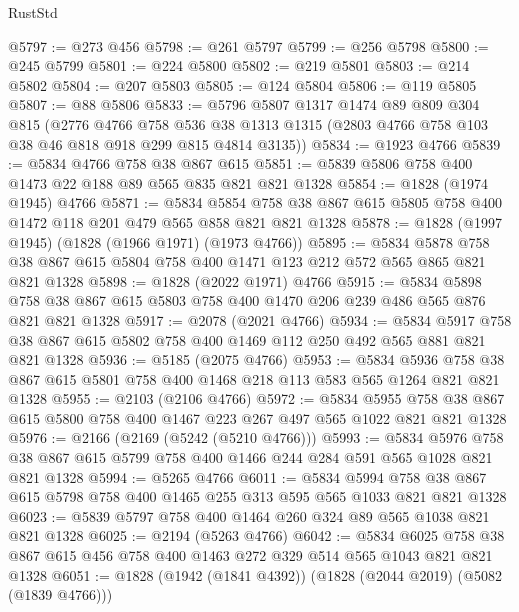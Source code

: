 \begin{lexlean}{RustStd}
\begin{coremodule}
@5797 := @273 @456
@5798 := @261 @5797
@5799 := @256 @5798
@5800 := @245 @5799
@5801 := @224 @5800
@5802 := @219 @5801
@5803 := @214 @5802
@5804 := @207 @5803
@5805 := @124 @5804
@5806 := @119 @5805
@5807 := @88 @5806
@5833 := @5796
    @5807
    @1317
    @1474
    @89
    @809
    @304
    @815
    (@2776
      @4766
      @758
      @536
      @38
      @1313
      @1315
      (@2803 @4766 @758 @103 @38 @46 @818 @918 @299 @815 @4814 @3135))
@5834 := @1923 @4766
@5839 := @5834 @4766 @758 @38 @867 @615
@5851 := @5839 @5806 @758 @400 @1473 @22 @188 @89 @565 @835 @821 @821 @1328
@5854 := @1828 (@1974 @1945) @4766
@5871 := @5834
    @5854
    @758
    @38
    @867
    @615
    @5805
    @758
    @400
    @1472
    @118
    @201
    @479
    @565
    @858
    @821
    @821
    @1328
@5878 := @1828 (@1997 @1945) (@1828 (@1966 @1971) (@1973 @4766))
@5895 := @5834
    @5878
    @758
    @38
    @867
    @615
    @5804
    @758
    @400
    @1471
    @123
    @212
    @572
    @565
    @865
    @821
    @821
    @1328
@5898 := @1828 (@2022 @1971) @4766
@5915 := @5834
    @5898
    @758
    @38
    @867
    @615
    @5803
    @758
    @400
    @1470
    @206
    @239
    @486
    @565
    @876
    @821
    @821
    @1328
@5917 := @2078 (@2021 @4766)
@5934 := @5834
    @5917
    @758
    @38
    @867
    @615
    @5802
    @758
    @400
    @1469
    @112
    @250
    @492
    @565
    @881
    @821
    @821
    @1328
@5936 := @5185 (@2075 @4766)
@5953 := @5834
    @5936
    @758
    @38
    @867
    @615
    @5801
    @758
    @400
    @1468
    @218
    @113
    @583
    @565
    @1264
    @821
    @821
    @1328
@5955 := @2103 (@2106 @4766)
@5972 := @5834
    @5955
    @758
    @38
    @867
    @615
    @5800
    @758
    @400
    @1467
    @223
    @267
    @497
    @565
    @1022
    @821
    @821
    @1328
@5976 := @2166 (@2169 (@5242 (@5210 @4766)))
@5993 := @5834
    @5976
    @758
    @38
    @867
    @615
    @5799
    @758
    @400
    @1466
    @244
    @284
    @591
    @565
    @1028
    @821
    @821
    @1328
@5994 := @5265 @4766
@6011 := @5834
    @5994
    @758
    @38
    @867
    @615
    @5798
    @758
    @400
    @1465
    @255
    @313
    @595
    @565
    @1033
    @821
    @821
    @1328
@6023 := @5839 @5797 @758 @400 @1464 @260 @324 @89 @565 @1038 @821 @821 @1328
@6025 := @2194 (@5263 @4766)
@6042 := @5834
    @6025
    @758
    @38
    @867
    @615
    @456
    @758
    @400
    @1463
    @272
    @329
    @514
    @565
    @1043
    @821
    @821
    @1328
@6051 := @1828 (@1942 (@1841 @4392)) (@1828 (@2044 @2019) (@5082 (@1839 @4766)))

\end{coremodule}
\end{lexlean}
